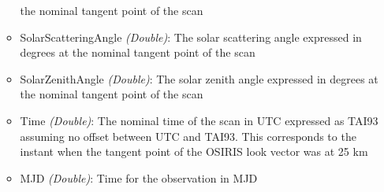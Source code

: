 \begin{itemize}
\begin{itemize}
                the nominal tangent point of the scan
            \item SolarScatteringAngle  \emph{(Double)}: The solar scattering angle expressed in degrees 
                at the nominal tangent point of the scan 
            \item SolarZenithAngle      \emph{(Double)}: The solar zenith angle expressed in degrees at 
                the nominal tangent point of the scan
            \item Time                  \emph{(Double)}: The nominal time of the scan in UTC expressed as 
                TAI93 assuming no offset between UTC and TAI93. This corresponds to the instant when the 
                tangent point of the OSIRIS look vector was at 25 km
            \item MJD \emph{(Double)}: Time for the observation in MJD
        \end{itemize}
\end{itemize}

